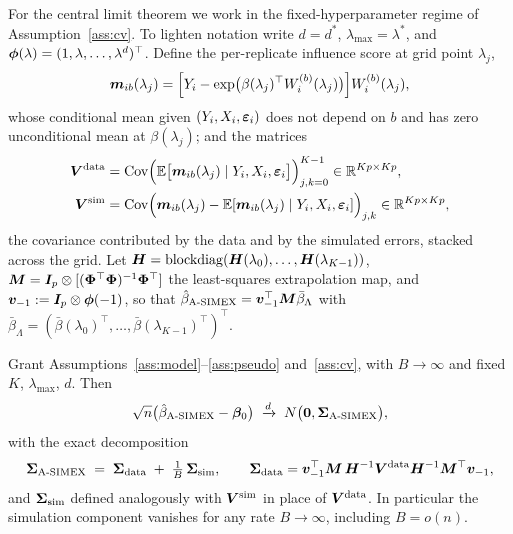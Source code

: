 For the central limit theorem we work in the fixed-hyperparameter
regime of Assumption~\ref{ass:cv}. To lighten notation write
$d=d^*$, $\lambda_{\max}=\lambda^*$, and
$\bm{\phi}(\lambda)=(1,\lambda,\dots,\lambda^d)^\top$. Define the
per-replicate influence score at grid point $\lambda_j$,
\[
  \bm m_{ib}(\lambda_j)
  =\Bigl[Y_i-\exp\bigl(\beta(\lambda_j)^\top W_i^{(b)}(\lambda_j)\bigr)\Bigr]
   W_i^{(b)}(\lambda_j),
\]
whose conditional mean given $(Y_i,X_i,\bm{\varepsilon}_i)$ does not depend on
$b$ and has zero unconditional mean at $\beta(\lambda_j)$; and the
matrices
\begin{align}
  \bm{V}^{\mathrm{data}}
  &=\mathrm{Cov}\Bigl(\mathbb{E}\bigl[\bm m_{ib}(\lambda_j)\mid
        Y_i,X_i,\bm{\varepsilon}_i\bigr]\Bigr)_{j,k=0}^{K-1}
   \in\mathbb{R}^{Kp\times Kp},\label{eq:vdata}\\
  \bm{V}^{\mathrm{sim}}
  &=\mathrm{Cov}\Bigl(\bm m_{ib}(\lambda_j)-\mathbb{E}[\bm m_{ib}(\lambda_j)\mid
        Y_i,X_i,\bm{\varepsilon}_i]\Bigr)_{j,k}
   \in\mathbb{R}^{Kp\times Kp},\label{eq:vsim}
\end{align}
the covariance contributed by the data and by the simulated errors,
stacked across the grid. Let
$\bm{H}=\operatorname{blockdiag}(\bm H(\lambda_0),\dots,
\bm H(\lambda_{K-1}))$,
$\bm M=\bm{I}_{p}\otimes[(\bm{\Phi}^\top\bm{\Phi})^{-1}\bm{\Phi}^\top]$ the
least-squares extrapolation map, and
$\bm v_{-1}:=\bm{I}_p\otimes\bm{\phi}(-1)$, so that
$\hat\beta_{\textup{A-SIMEX}}=\bm v_{-1}^\top\bm M\bar\beta_\Lambda$ with
$\bar\beta_\Lambda=(\bar\beta(\lambda_0)^\top,\dots,
\bar\beta(\lambda_{K-1})^\top)^\top$.

\begin{theorem}\label{thm:an}
Grant Assumptions~\ref{ass:model}--\ref{ass:pseudo} and~\ref{ass:cv},
with $B\to\infty$ and fixed $K$, $\lambda_{\max}$, $d$. Then
\[
  \sqrt n\bigl(\hat\beta_{\textup{A-SIMEX}}-\bm{\beta}_0\bigr)
  \;\xrightarrow{d}\;N\bigl(\bm 0,\bm{\Sigma}_{\textup{A-SIMEX}}\bigr),
\]
with the exact decomposition
\begin{equation}\label{eq:decomp}
  \bm{\Sigma}_{\textup{A-SIMEX}}
  \;=\;\bm{\Sigma}_{\mathrm{data}}\;+\;\tfrac1B\,\bm{\Sigma}_{\mathrm{sim}},
  \qquad
  \bm{\Sigma}_{\mathrm{data}}=\bm v_{-1}^\top\bm M\,
    \bm{H}^{-1}\bm{V}^{\mathrm{data}}\bm{H}^{-1}\bm M^\top\bm v_{-1},
\end{equation}
and $\bm{\Sigma}_{\mathrm{sim}}$ defined analogously with
$\bm{V}^{\mathrm{sim}}$ in place of $\bm{V}^{\mathrm{data}}$. In
particular the simulation component vanishes for any rate
$B\to\infty$, including $B=o(n)$.
\end{theorem}

